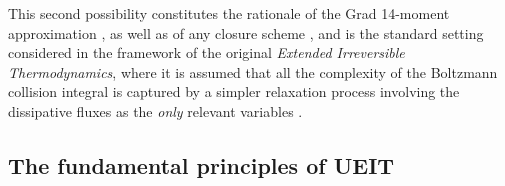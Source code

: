 \documentclass[a4paper, amsfonts, amssymb, amsmath, reprint, twocolumn, showkeys, nofootinbib]{revtex4-2}
\begin{document}
This second possibility constitutes the rationale of the Grad 14-moment approximation \cite{Israel_Stewart_1979}, as well as of any closure scheme \cite{AnileRadiazion1992}, and is the standard setting considered in the framework of the original \textit{Extended Irreversible Thermodynamics}, where it is assumed that all the complexity of the Boltzmann collision integral is captured by a simpler relaxation process involving the dissipative fluxes as the \textit{only} relevant variables \citep{cattaneo1958,Jou_Extended}. 





\subsection{The fundamental principles of UEIT}
\label{fondamentaloniRADICEdiA}
\end{document}
